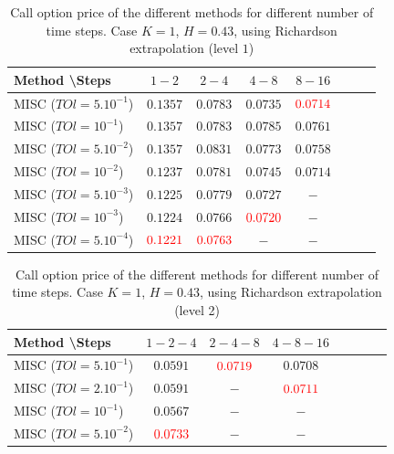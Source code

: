 \documentclass[11pt]{article}
\begin{document}
\begin{table}[h!]
	\centering
	\begin{tabular}{l*{6}{c}r}
		Method \textbackslash  Steps           &$1-2$ & $2-4$ & $4-8$ & $8-16$\\
		\hline
		MISC ($TOl=5.10^{-1}$)& $0.1357$  & $0.0783$ & $0.0735$ & ${\color{red}0.0714}$ \\
		MISC ($TOl=10^{-1}$)  &$0.1357$  &$0.0783$ & $0.0785$ & $0.0761$  \\
		MISC ($TOl=5.10^{-2}$)  & $0.1357$ & $0.0831$ & $0.0773$ & $0.0758$   \\
		MISC ($TOl=10^{-2}$)  & $0.1237$ &$0.0781$ & $0.0745$ & $0.0714$  \\
		MISC ($TOl=5.10^{-3}$)  & $0.1225$ &$0.0779$ & $0.0727$ & $-$  \\	
		MISC ($TOl=10^{-3}$)  & $0.1224$ &$0.0766$ & ${\color{red}0.0720}$ & $-$ \\
		MISC ($TOl=5.10^{-4}$)  &${\color{red}0.1221}$ & ${\color{red}0.0763}$ & $-$ & $-$ \\
		\hline
	\end{tabular}
	\caption{ Call option price of the different methods for different number of time steps. Case $K=1$, $H=0.43$, using Richardson extrapolation (level $1$)}
	\label{table: Call option price of the different methods for different number of time steps. Case $K=1$, using Richardson extrapolation}
\end{table}







\begin{table}[h!]
	\centering
	\begin{tabular}{l*{6}{c}r}
		Method \textbackslash  Steps           &$1-2-4$ & $2-4-8$ & $4-8-16$\\
		\hline
		MISC ($TOl=5.10^{-1}$)& $0.0591$  & ${\color{red}0.0719}$ & $0.0708$  \\
		MISC ($TOl=2.10^{-1}$)  &$0.0591$ &$-$ & ${\color{red}0.0711}$  \\
		MISC ($TOl=10^{-1}$)  &$0.0567$  &$-$ & $-$   \\
		MISC ($TOl=5.10^{-2}$)  & ${\color{red}0.0733}$ & $-$ & $-$  \\
		\hline
	\end{tabular}
	\caption{ Call option price of the different methods for different number of time steps. Case $K=1$, $H=0.43$, using Richardson extrapolation (level 2)}
	\label{table: Call option price of the different methods for different number of time steps. Case $K=1$, using Richardson extrapolation_level2}
\end{table}
\end{document}
